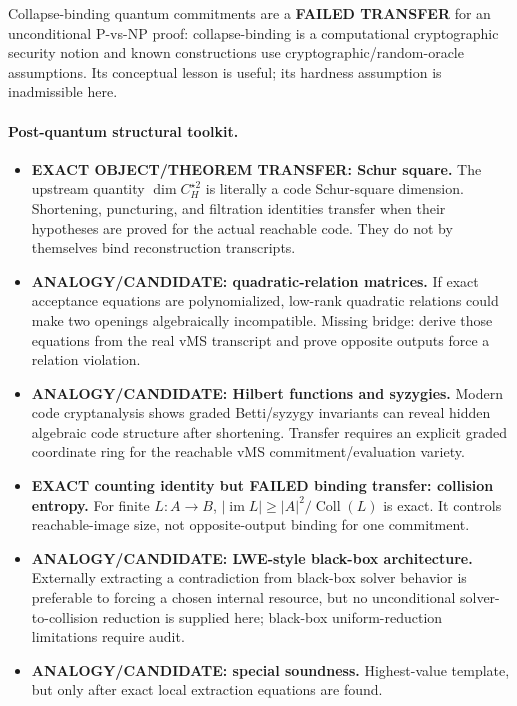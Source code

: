 \documentclass[11pt]{article}
\begin{document}
Collapse-binding quantum commitments are a \textbf{FAILED TRANSFER} for an unconditional P-vs-NP proof: collapse-binding is a computational cryptographic security notion and known constructions use cryptographic/random-oracle assumptions. Its conceptual lesson is useful; its hardness assumption is inadmissible here.

\paragraph{Post-quantum structural toolkit.}
\begin{itemize}
\item[] \textbf{EXACT OBJECT/THEOREM TRANSFER: Schur square.} The upstream quantity $\dim C_H^{\star2}$ is literally a code Schur-square dimension. Shortening, puncturing, and filtration identities transfer when their hypotheses are proved for the actual reachable code. They do not by themselves bind reconstruction transcripts.
\item[] \textbf{ANALOGY/CANDIDATE: quadratic-relation matrices.} If exact acceptance equations are polynomialized, low-rank quadratic relations could make two openings algebraically incompatible. Missing bridge: derive those equations from the real vMS transcript and prove opposite outputs force a relation violation.
\item[] \textbf{ANALOGY/CANDIDATE: Hilbert functions and syzygies.} Modern code cryptanalysis shows graded Betti/syzygy invariants can reveal hidden algebraic code structure after shortening. Transfer requires an explicit graded coordinate ring for the reachable vMS commitment/evaluation variety.
\item[] \textbf{EXACT counting identity but FAILED binding transfer: collision entropy.} For finite $L:A\to B$, $|\operatorname{im}L|\ge |A|^2/\operatorname{Coll}(L)$ is exact. It controls reachable-image size, not opposite-output binding for one commitment.
\item[] \textbf{ANALOGY/CANDIDATE: LWE-style black-box architecture.} Externally extracting a contradiction from black-box solver behavior is preferable to forcing a chosen internal resource, but no unconditional solver-to-collision reduction is supplied here; black-box uniform-reduction limitations require audit.
\item[] \textbf{ANALOGY/CANDIDATE: special soundness.} Highest-value template, but only after exact local extraction equations are found.
\end{itemize}
\end{document}
